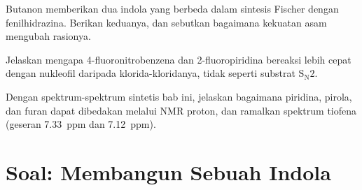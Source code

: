 \begin{exercise}[$\star\star\star$]\label{exo:b3:heterocycles:10}
Butanon memberikan dua indola yang berbeda dalam sintesis Fischer dengan
fenilhidrazina. Berikan keduanya, dan sebutkan bagaimana kekuatan asam mengubah rasionya.
\end{exercise}

\begin{exercise}[$\star\star\star$]\label{exo:b3:heterocycles:11}
Jelaskan mengapa 4-fluoronitrobenzena dan 2-fluoropiridina bereaksi lebih cepat dengan
nukleofil daripada klorida-kloridanya, tidak seperti substrat $\mathrm S_\mathrm N2$.
\end{exercise}

\begin{exercise}[$\star\star\star$]\label{exo:b3:heterocycles:12}
Dengan spektrum-spektrum sintetis bab ini, jelaskan bagaimana piridina,
pirola, dan furan dapat dibedakan melalui NMR proton, dan ramalkan spektrum
tiofena (geseran \qty{7.33}{ppm} dan \qty{7.12}{ppm}).
\end{exercise}

\section{Soal: Membangun Sebuah Indola}

